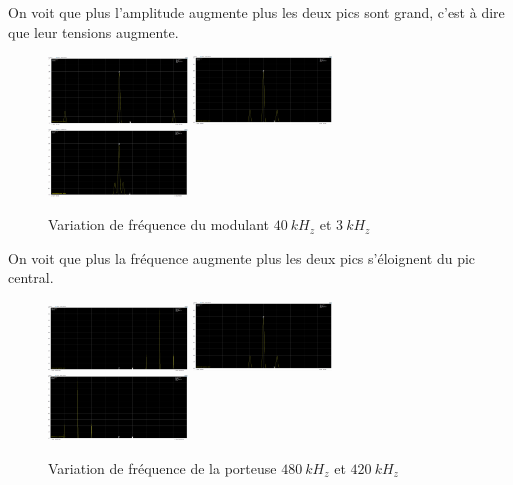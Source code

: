 \documentclass[11pt, openright]{book}
\begin{document}
On voit que plus l'amplitude augmente plus les deux pics sont grand, c'est à dire que leur tensions augmente.

\begin{figure}[ht]
    \centering
    \includegraphics[width=0.33\textwidth]{./object/g9.png}
    \includegraphics[width=0.33\textwidth]{./object/g6.png}
    \includegraphics[width=0.33\textwidth]{./object/g10.png}
    \caption{Variation de fréquence du modulant $40\ kH_z$ et $3\ kH_z$}
\end{figure}

On voit que plus la fréquence augmente plus les deux pics s'éloignent du pic central.

\begin{figure}[ht]
    \centering
    \includegraphics[width=0.33\textwidth]{./object/g11.png}
    \includegraphics[width=0.33\textwidth]{./object/g6.png}
    \includegraphics[width=0.33\textwidth]{./object/g12.png}
    \caption{Variation de fréquence de la porteuse $480\ kH_z$ et $420\ kH_z$}
\end{figure}
\end{document}
